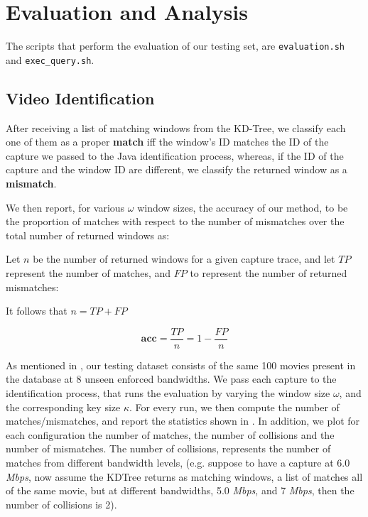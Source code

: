 \chapter{Evaluation and Analysis}\label{sec:results}

The scripts that perform the evaluation of our testing set, are \texttt{evaluation.sh} and \texttt{exec\_query.sh}.

\section{Video Identification}
After receiving a list of matching windows from the KD-Tree, we classify each one of them as a proper \textbf{match} iff the window's ID matches the ID of the capture we passed to the Java identification process, whereas, if the ID of the capture and the window ID are different, we classify the returned window as a \textbf{mismatch}.

We then report, for various $\omega$ window sizes, the accuracy of our method, to be the proportion of matches with respect to the number of mismatches over the total number of returned windows as:

Let $n$ be the number of returned windows for a given capture trace, and let $TP$ represent the number of matches, and $FP$ to represent the number of returned mismatches:

It follows that $n = TP + FP$

\begin{equation*}
    \mathbf{acc} = \dfrac{TP}{n} = 1 - \dfrac{FP}{n}
\end{equation*}

As mentioned in , our testing dataset consists of the same 100 movies present in the database at 8 unseen enforced bandwidths. We pass each capture to the identification process, that runs the evaluation by varying the window size $\omega$, and the corresponding key size $\kappa$. For every run, we then compute the number of matches/mismatches, and report the statistics shown in . In addition, we plot for each configuration the number of matches, the number of collisions and the number of mismatches. The number of collisions, represents the number of matches from different bandwidth levels, (e.g. suppose to have a capture at 6.0 \emph{Mbps}, now assume the KDTree returns as matching windows, a list of matches all of the same movie, but at different bandwidths, 5.0 \emph{Mbps}, and 7 \emph{Mbps}, then the number of collisions is 2).

